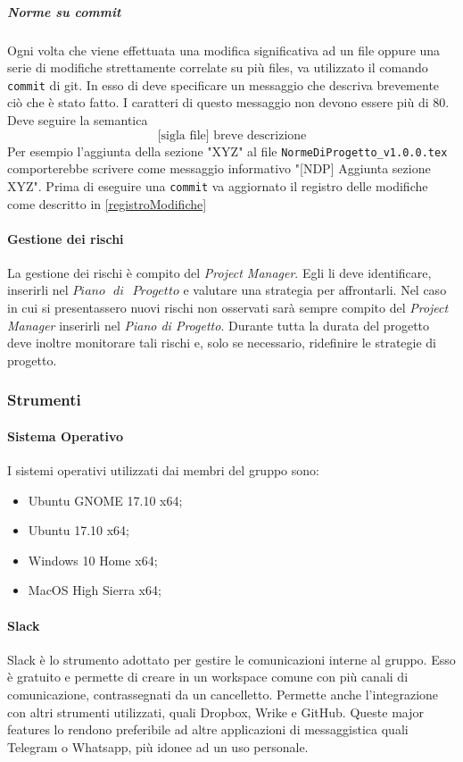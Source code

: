 			\subparagraph{Norme su commit}\Spazio
			Ogni volta che viene effettuata una modifica significativa ad un file oppure una serie di modifiche strettamente correlate su più files, va utilizzato il comando \texttt{commit} di git. In esso di deve specificare un messaggio che descriva brevemente ciò che è stato fatto. I caratteri di questo messaggio non devono essere più di 80. Deve seguire la semantica
			$$\text{[sigla file] breve descrizione}$$
			Per esempio l'aggiunta della sezione "XYZ" al file \texttt{NormeDiProgetto\_v1.0.0.tex} comporterebbe scrivere come messaggio informativo "[NDP] Aggiunta sezione XYZ". Prima di eseguire una \texttt{commit} va aggiornato il registro delle modifiche come descritto in \ref{registroModifiche}
			
		\paragraph{Gestione dei rischi} \Spazio
		La gestione dei rischi è compito del \emph{Project Manager}. Egli li deve identificare, inserirli nel $Piano\text{ }di\text{ }Progetto$ e valutare una strategia per affrontarli. Nel caso in cui si presentassero nuovi rischi non osservati sarà sempre compito del \emph{Project Manager} inserirli nel \emph{Piano di Progetto}. Durante tutta la durata del progetto deve inoltre monitorare tali rischi e, solo se necessario, ridefinire le strategie di progetto.
		
	\subsubsection{Strumenti}
		\paragraph{Sistema Operativo} \Spazio
		I sistemi operativi utilizzati dai membri del gruppo sono:
		\begin{itemize}
			\item Ubuntu GNOME 17.10 x64;
			\item Ubuntu 17.10 x64;
			\item Windows 10 Home x64;
			\item MacOS High Sierra x64;
		\end{itemize}
		
		\paragraph{Slack}\Spazio
		Slack è lo strumento adottato per gestire le comunicazioni interne al gruppo. Esso è gratuito e permette di creare in un workspace comune con più canali di comunicazione, contrassegnati da un cancelletto. Permette anche l'integrazione con altri strumenti utilizzati, quali Dropbox, Wrike e GitHub. Queste major features lo rendono preferibile ad altre applicazioni di messaggistica quali Telegram o Whatsapp, più idonee ad un uso personale. 
		
